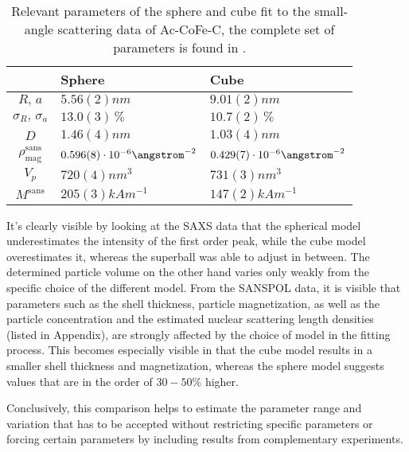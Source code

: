 \documentclass[\main/dresen_thesis.tex]{subfiles}
\begin{document}
    \begin{table}[ht]
      \centering
      \caption{\label{tab:monolayers:nanoparticle:sasSphereCubeFit}Relevant parameters of the sphere and cube fit to the small-angle scattering data of Ac-CoFe-C, the complete set of parameters is found in .}
      \begin{tabular}{ c | l | l }
          & Sphere & Cube \\
        \hline
        $R, \, a$
          & $5.56(2) \unit{nm}$
          & $9.01(2) \unit{nm}$\\
        $\sigma_R, \, \sigma_a$
          & $13.0(3) \,\%$
          & $10.7(2) \,\%$\\
        $D$
          & $1.46(4) \unit{nm}$
          & $1.03(4) \unit{nm}$\\
        $\rho_\mathrm{mag}^\mathrm{sans}$
          & $0.596(8) \cdot 10^{-6} \angstrom^{-2}$
          & $0.429(7) \cdot 10^{-6} \angstrom^{-2}$\\
        \hline
        $V_p$
          & $720(4) \unit{nm^{3}}$
          & $731(3) \unit{nm^{3}}$\\
        $M^\mathrm{sans}$
          & $205(3) \unit{kAm^{-1}}$
          & $147(2) \unit{kAm^{-1}}$\\
        \hline
      \end{tabular}
    \end{table}

    It's clearly visible by looking at the SAXS data that the spherical model underestimates the intensity of the first order peak, while the cube model overestimates it, whereas the superball was able to adjust in between.
    The determined particle volume on the other hand varies only weakly from the specific choice of the different model.
    From the SANSPOL data, it is visible that parameters such as the shell thickness, particle magnetization, as well as the particle concentration and the estimated nuclear scattering length densities (listed in Appendix), are strongly affected by the choice of model in the fitting process.
    This becomes especially visible in that the cube model results in a smaller shell thickness and magnetization, whereas the sphere model suggests values that are in the order of $30 - 50 \unit{\%}$ higher.

    Conclusively, this comparison helps to estimate the parameter range and variation that has to be accepted without restricting specific parameters or forcing certain parameters by including results from complementary experiments.
\end{document}
